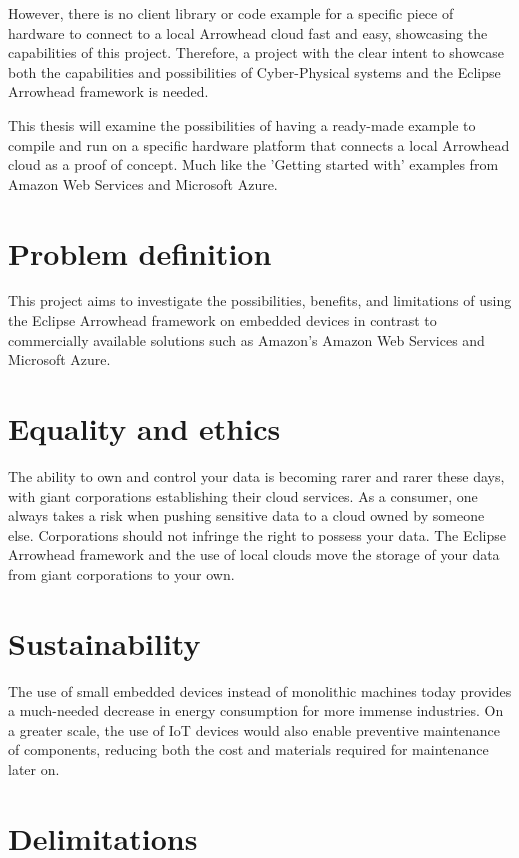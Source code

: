 However, there is no client library or code example for a specific piece of hardware to connect to a local Arrowhead cloud fast and easy, showcasing the capabilities of this project. 
Therefore, a project with the clear intent to showcase both the capabilities and possibilities of Cyber-Physical systems and the Eclipse Arrowhead framework is needed.

This thesis will examine the possibilities of having a ready-made example to compile and run on a specific hardware platform that connects a local Arrowhead cloud as a proof of concept. 
Much like the 'Getting started with' examples from Amazon Web Services and Microsoft Azure.\cite{Guide2020,AZURE2021}
\section{Problem definition}
This project aims to investigate the possibilities, benefits, and limitations of using the Eclipse Arrowhead framework on embedded devices in contrast to commercially available solutions such
as Amazon's Amazon Web Services and Microsoft Azure. 
\section{Equality and ethics}
The ability to own and control your data is becoming rarer and rarer these days, with giant corporations establishing their cloud services.
As a consumer, one always takes a risk when pushing sensitive data to a cloud owned by someone else. Corporations should not infringe the right to possess your data. 
The Eclipse Arrowhead framework and the use of local clouds move the storage of your data from giant corporations to your own.
\section{Sustainability}
The use of small embedded devices instead of monolithic machines today provides a much-needed decrease in energy consumption for more immense industries.
On a greater scale, the use of IoT devices would also enable preventive maintenance of components, reducing both the cost and materials required for maintenance later on.
\section{Delimitations}
